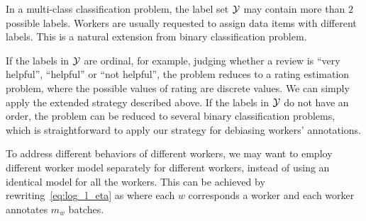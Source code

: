 In a multi-class classification problem, 
the label set ${\mathcal{Y}}$ may contain more than $2$ possible labels.  
Workers are usually requested to assign data items with different labels.  
This is a natural extension from binary classification problem.  

If the labels in ${\mathcal{Y}}$ are ordinal, 
for example, judging whether a review is ``very helpful'', ``helpful'' or ``not helpful'', 
the problem reduces to a rating estimation problem, 
where the possible values of rating are discrete values.  
We can simply apply the extended strategy described above.  
If the labels in ${\mathcal{Y}}$ do not have an order, 
the problem can be reduced to several binary classification problems, 
which is straightforward to apply our strategy for debiasing workers' annotations.  


To address different behaviors of different workers, 
we may want to employ different worker model separately for different workers, 
instead of using an identical model for all the workers.  
This can be achieved by rewriting~\eqref{eq:log_l_eta} as 
%
where each $w$ corresponds a worker and each worker annotates $m_w$ batches.  




